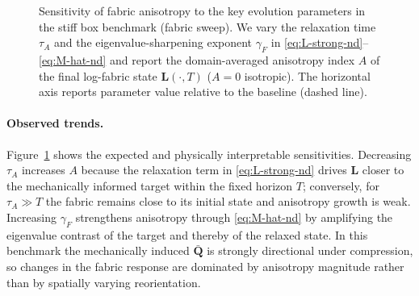 \begin{figure}[htbp]
  \centering
  \caption{Sensitivity of fabric anisotropy to the key evolution parameters in the stiff box benchmark (fabric sweep).
  We vary the relaxation time $\tau_A$ and the eigenvalue-sharpening exponent $\gamma_F$ in \eqref{eq:L-strong-nd}--\eqref{eq:M-hat-nd} and report the domain-averaged anisotropy index $A$ of the final log-fabric state $\mathbf{L}(\cdot,T)$ ($A=0$ isotropic).
  The horizontal axis reports parameter value relative to the baseline (dashed line).}
  \label{fig:fabric_diagnostic}
\end{figure}

\paragraph{Observed trends.}
Figure~\ref{fig:fabric_diagnostic} shows the expected and physically interpretable sensitivities.
Decreasing $\tau_A$ increases $A$ because the relaxation term in \eqref{eq:L-strong-nd} drives $\mathbf{L}$ closer to the mechanically informed target within the fixed horizon $T$; conversely, for $\tau_A\gg T$ the fabric remains close to its initial state and anisotropy growth is weak.
Increasing $\gamma_F$ strengthens anisotropy through \eqref{eq:M-hat-nd} by amplifying the eigenvalue contrast of the target and thereby of the relaxed state.
In this benchmark the mechanically induced $\bar{\mathbf{Q}}$ is strongly directional under compression, so changes in the fabric response are dominated by anisotropy magnitude rather than by spatially varying reorientation.
